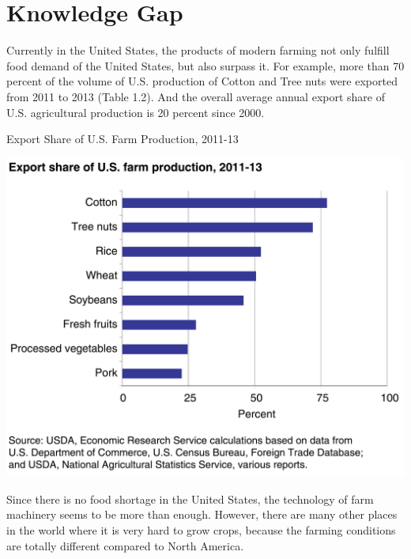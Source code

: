 \documentclass[letterpaper,12pt,oneside]{book}
\begin{document}
		
		\section{Knowledge Gap}
				
		 Currently in the United States, the products of modern farming not only fulfill food demand of the United States, but also surpass it. For example, more than 70 percent of the volume of U.S. production of Cotton and Tree nuts were exported from 2011 to 2013 (Table 1.2). And the overall average annual export share of U.S. agricultural production is 20 percent since 2000. \cite{Exports}
		\begin{table}[ht!]
			\begin{center}
				\caption{Export Share of U.S. Farm Production, 2011-13}
				\includegraphics[scale = 0.4]{cropexport.png}
			\end{center}
		\end{table}
		Since there is no food shortage in the United States, the technology of farm machinery seems to be more than enough. However, there are many other places in the world where it is very hard to grow crops, because the farming conditions are totally different compared to North America. 
\end{document}
